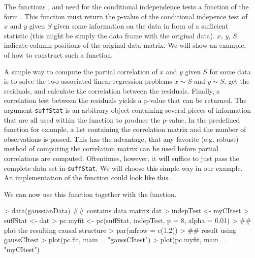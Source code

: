 \documentclass[article]{jss}
\begin{document}
The functions ,  and  need for the
conditional independence tests a function of the form . This function must return the p-value of the conditional
indepence test of $x$ and $y$ given $S$ given some information on the data
in form of a sufficient statistic (this might be simply the data frame with
the original data). $x$, $y$, $S$ indicate column positions of the original
data matrix. We will show an example, of how to construct such a function. 

A simple way to compute the partial correlation of $x$ and $y$ given $S$
for some data is to solve the two associated linear regression problems $x
\sim S$ and $y \sim S$, get the residuals, and calculate the correlation
between the residuals. Finally, a correlation test between the residuals
yields a p-value that can be returned. The argument \texttt{suffStat} is an
arbitrary object containing several pieces of information that are all used
within the function to produce the p-value. In the predefined function
 for example, a list containing the correlation matrix
and the number of observations is passed. This has the advantage, that any
favorite (e.g. robust) method of computing the correlation matrix can be
used before partial correlations are computed. Oftentimes, however, it will
suffice to just pass the complete data set in \texttt{suffStat}. We will
choose this simple way in our example. An implementation of the function
 could look like this.
\begin{Schunk}
\end{Schunk}
We can now use this function together with the  function.

\begin{Schunk}
\begin{Sinput}
> data(gaussianData) ## contains data matrix dat
> indepTest <- myCItest 
> suffStat <- dat
> pc.myfit <- pc(suffStat, indepTest, p = 8, alpha = 0.01)
> ## plot the resulting causal structure
> par(mfrow = c(1,2))
> ## result using gaussCItest
> plot(pc.fit, main = "gaussCItest")
> plot(pc.myfit, main = "myCItest")
\end{Sinput}
\end{Schunk}
\end{document}
